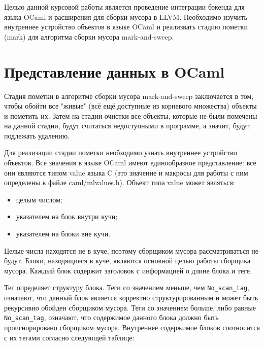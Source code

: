 Целью данной курсовой работы является проведение интеграции бэкенда для языка OCaml и расширения для сборки мусора в LLVM. Необходимо изучить внутреннее 
устройство объектов в языке OCaml и реализвать стадию пометки (mark) для алгоритма сборки мусора mark-and-sweep.

\section{Представление данных в OCaml}

Стадия пометки в алгоритме сборки мусора mark-and-sweep заключается в том, чтобы обойти все "живые" (всё ещё доступные из корневого множества)
объекты и пометить их. Затем на стадии очистки все объекты, которые не были помечены на данной стадии, будут считаться недоступными в программе, а значит,
будут подлежать удалению.

Для реализации стадии пометки необходимо узнать внутреннее устройство объектов.
Все значения в языке OCaml имеют единообразное представление: все они являются типом value языка C (это значение и макросы для работы с ним
определены в файле caml/mlvalues.h). Объект типа value может являться:

\begin{itemize}
   \item целым числом;
   \item указателем на блок внутри кучи;
   \item указателем на блоки вне кучи.
\end{itemize}

Целые числа находятся не в куче, поэтому сборщиком мусора рассматриваться не будут. Блоки, находящиеся в куче, являются основной целью работы сборщика
мусора. Каждый блок содержит заголовок с информацией о длине блока и теге.

Тег определяет структуру блока. Теги со значением меньше, чем \texttt{No\_scan\_tag}, 
означают, что данный блок является корректно структурированным и может быть рекурсивно обойден сборщиком мусора. 
Теги со значением больше, либо равные \texttt{No\_scan\_tag}, означают, что содержимое данного блока должно быть проигнорировано сборщиком мусора. Внутреннее
содержимое блоков соотносится с их тегами согласно следующей таблице:

